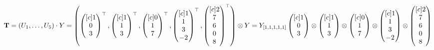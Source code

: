 \documentclass[11pt]{article} %
\renewcommand{\_}{\rule{0.2cm}{.5pt}}
\begin{document}
$ \mathbf{T} = (U_{1},\dots,U_{5}) \cdot Y = \left(
\begin{pmatrix}[c]
  1 \\
  0 \\
  3 
\end{pmatrix}^{\top},
\begin{pmatrix}[c]
  1 \\
  1 \\
  3 
\end{pmatrix}^{\top},
\begin{pmatrix}[c]
  0 \\
  1 \\
  7 
\end{pmatrix}^{\top},
\begin{pmatrix}[c]
  1 \\
  1 \\
  3 \\
  -2
\end{pmatrix}^{\top},
\begin{pmatrix}[c]
  2 \\
  7 \\
  6 \\
  0 \\
  8
\end{pmatrix}^{\top} \right) \otimes Y \\
= 
Y_{[1,1,1,1,1]} 
\begin{pmatrix}[c]
  1 \\
  0 \\
  3 
\end{pmatrix} \otimes
\begin{pmatrix}[c]
  1 \\
  1 \\
  3 
\end{pmatrix} \otimes
\begin{pmatrix}[c]
  0 \\
  1 \\
  7 
\end{pmatrix} \otimes
\begin{pmatrix}[c]
  1 \\
  1 \\
  3 \\
  -2
\end{pmatrix} \otimes
\begin{pmatrix}[c]
  2 \\
  7 \\
  6 \\
  0 \\
  8
\end{pmatrix}
$
\end{document}
